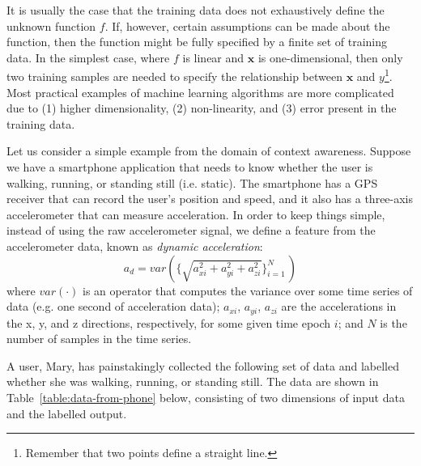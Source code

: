 It is usually the case that the training data does not exhaustively define the unknown function $f$. If, however, certain assumptions can be made about the function, then the function might be fully specified by a finite set of training data. In the simplest case, where $f$ is linear and $\mathbf{x}$ is one-dimensional, then only two training samples are needed to specify the relationship between $\mathbf{x}$ and $y$\footnote{Remember that two points define a straight line.}. Most practical examples of machine learning algorithms are more complicated due to (1) higher dimensionality, (2) non-linearity, and (3) error present in the training data.

Let us consider a simple example from the domain of context awareness. Suppose we have a smartphone application that needs to know whether the user is walking, running, or standing still (i.e. static). The smartphone has a GPS receiver that can record the user's position and speed, and it also has a three-axis accelerometer that can measure acceleration. In order to keep things simple, instead of using the raw accelerometer signal, we define a feature from the accelerometer data, known as \emph{dynamic acceleration}:
%
\begin{equation}
a_d = var(\{\sqrt{a_{xi}^2 + a_{yi}^2 + a_{zi}^2}\}_{i=1}^N\,)
\end{equation}
%
where $var(\cdot)$ is an operator that computes the variance over some time series of data (e.g. one second of acceleration data); $a_{xi}$, $a_{yi}$, $a_{zi}$ are the accelerations in the x, y, and z directions, respectively, for some given time epoch $i$; and $N$ is the number of samples in the time series.

A user, Mary, has painstakingly collected the following set of data and labelled whether she was walking, running, or standing still. The data are shown in Table~\ref{table:data-from-phone} below, consisting of two dimensions of input data and the labelled output.


